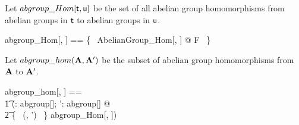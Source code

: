 \documentclass{amsart}
\begin{document}
Let $abgroup\_Hom[\mathsf{t}, \mathsf{u}]$ be the set of all abelian group homomorphisms
from abelian groups in $\mathsf{t}$ to abelian groups in $\mathsf{u}$.

\begin{zed}
	abgroup\_Hom[\genT, \genU] == \{~ AbelianGroup\_Hom[\genT, \genU] @ F ~\}
\end{zed}

Let $abgroup\_hom(\mathbf{A}, \mathbf{A}')$ be the subset of abelian group homomorphisms
from $\mathbf{A}$ to $\mathbf{A}'$.

\begin{zed}
	abgroup\_hom[\genT, \genU] == \\
	\t1	(\lambda \strucA: abgroup[\genT]; \strucA': abgroup[\genU] @ \\
	\t2		\{~ (\strucA, \strucA') ~\} \dres abgroup\_Hom[\genT, \genU])
\end{zed}

\printbibliography
\end{document}
